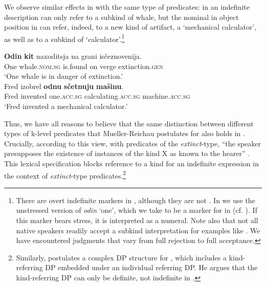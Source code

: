 \documentclass[output=paper
,modfonts
,nonflat]{langsci/langscibook}
\begin{document}
	We observe similar effects in  with the same type of predicates: in  an indefinite description can only refer to a subkind of whale, but the nominal in object position in  can refer, indeed, to a new kind of artifact, a `mechanical calculator', as well as to a subkind of `calculator'.\footnote{There are overt indefinite markers in , although they are not . In  we use the unstressed version of \textit{odin} `one', which we take to be a  marker for  in  (cf. \citealt{Ionin2013}). If this marker bears stress, it is interpreted as a numeral. 
		Note also that not all native speakers readily accept a subkind interpretation for examples like . We have encountered judgments that vary from full rejection to full acceptance.}
	
	\ea\label{ex:borik:12}
	\ea\label{ex:borik:12a}
	\gll \textbf{Odin} \textbf{kit} naxoditsja na grani is\v{c}eznovenija.\\
	One whale.\textsc{nom.sg} is.found on verge extinction.\textsc{gen}\\
	\glt	`One whale is in danger of extinction.'\\
	\ex\label{ex:borik:12b}
	\gll Fred izobrel \textbf{odnu} \textbf{s\v{c}etnuju} \textbf{ma\v{s}inu}.\\
	Fred invented one.\textsc{acc.sg} calculating.\textsc{acc.sg} machine.\textsc{acc.sg}\\
	\glt `Fred invented a mechanical calculator.'
	\z
	\z
	
	Thus, we have all reasons to believe that the same distinction between different types of k-level predicates that Mueller-Reichau postulates for  also holds in . Crucially, according to this view, with predicates of the \textit{extinct}-type, ``the speaker presupposes the existence of instances of the kind X as known to the hearer'' \citep[80]{Mueller-Reichau2011}. This lexical specification blocks reference to a kind for an indefinite expression in the context of \textit{extinct}-type predicates.\footnote{Similarly, \citet{Stankovic2016} postulates a complex DP structure for , which includes a kind-referring DP embedded under an individual referring DP. He argues that the kind-referring DP can only be definite, not indefinite in .}
	
\end{document}
